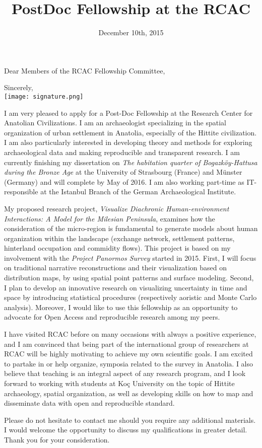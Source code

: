 \documentclass[11pt,a4paper,sans]{moderncv}
\title{PostDoc Fellowship at the RCAC}
\begin{document}

\date{December 10th, 2015}
\opening{Dear Members of the RCAC Fellowship Committee,}
\closing{Sincerely, \\ \vspace{0.5cm} \texttt{[image: signature.png]}}
\makelettertitle

I am very pleased to apply for a Post-Doc Fellowship at the Research Center for
Anatolian Civilizations. I am an archaeologist specializing in the spatial
organization of urban settlement in Anatolia, especially of the Hittite
civilization. I am also particularly interested in developing theory and methods
for exploring archaeological data and making reproducible and transparent
research. I am currently finishing my dissertation on \textit{The habitation quarter
of Bogazköy-Hattusa during the Bronze Age} at the University of Strasbourg
(France) and Münster  (Germany) and will complete by May of 2016. I am also
working part-time as IT-responsible at the Istanbul Branch of the German
Archaeological Institute.

My proposed research project, \textit{Visualize Diachronic Human-environment
Interactions: A Model for the Milesian Peninsula}, examines how the
consideration of the micro-region is fundamental to generate models about human
organization within the landscape (exchange network, settlement patterns,
hinterland occupation and commidity flows). This project is based on my
involvement with the \textit{Project Panormos Survey} started in 2015.
First, I will focus on traditional narrative reconstructions and their
visualization based on distribution maps, by using spatial point patterns and
surface modeling. Second, I plan to develop an innovative research on
visualizing uncertainty in time and space by introducing statistical procedures
(respectively aoristic and Monte Carlo analysis). Moreover, I would like to use
this fellowship as an opportunity to advocate for Open Access and reproducible
research among my peers. 

I have visited RCAC before on many occasions with always a positive experience,
and I am convinced that being part of the international group of researchers at
RCAC will be highly motivating to achieve my own scientific goals. I am excited
to partake in or help organize, symposia related to the survey in
Anatolia. I also believe that teaching is an integral aspect of any research
program, and I look forward to working with students at Koç University on the
topic of Hittite archaeology, spatial organization, as well as developing skills on how to
map and disseminate data with open and reproducible standard. 

 
Please do not hesitate to contact me should you require any additional
materials. I would welcome the opportunity to discuss my qualifications in
greater detail. Thank you for your consideration.


\makeletterclosing

\end{document}
